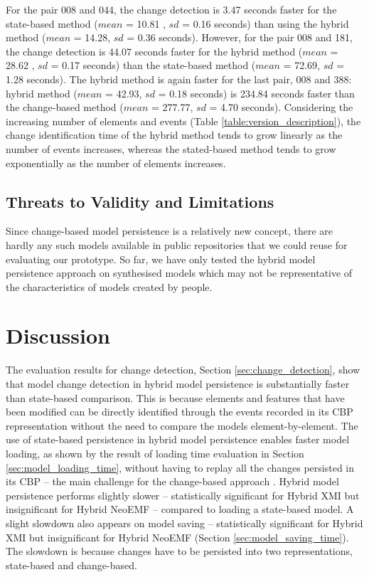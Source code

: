 \documentclass{llncs}
\begin{document}
For the pair 008 and 044, the change detection is 3.47 seconds faster for the state-based method ($mean$ = 10.81 , $sd$ = 0.16 seconds) than using the hybrid method ($mean$ = 14.28, $sd$ = 0.36 seconds). However, for the pair 008 and 181, the change detection is 44.07 seconds faster for the hybrid method ($mean$ = 28.62 , $sd$ = 0.17 seconds) than the state-based method ($mean$ = 72.69, $sd$ = 1.28 seconds). The hybrid method is again faster for the last pair, 008 and 388: hybrid method ($mean$ = 42.93, $sd$ = 0.18 seconds) is 234.84 seconds faster than the change-based method ($mean$ = 277.77, $sd$ = 4.70 seconds). Considering the increasing number of elements and events (Table \ref{table:version_description}), the change identification time of the hybrid method tends to grow linearly as the number of events increases, whereas the stated-based method tends to grow exponentially as the number of elements increases.

\subsection{Threats to Validity and Limitations}
\label{sec:threats_to_validity_and_limitations}
Since change-based model persistence is a relatively new concept, there are hardly any such models available in public repositories that we could reuse for evaluating our prototype. So far, we have only tested the hybrid model persistence approach on synthesised models which may not be representative of the characteristics of models created by people.

\section{Discussion}
\label{sec:discussion}
The evaluation results for change detection, Section \ref{sec:change_detection}, show that model change detection in hybrid model persistence is substantially faster than state-based comparison. This is because elements and features that have been modified can be directly identified through the events recorded in its CBP representation without the need to compare the models element-by-element. The use of state-based persistence in hybrid model persistence enables faster model loading, as shown by the result of loading time evaluation in Section \ref{sec:model_loading_time}, without having to replay all the changes persisted in its CBP -- the main challenge for the change-based approach \cite{yohannis2018towards,mens2002state}. 
Hybrid model persistence performs slightly slower -- statistically significant for Hybrid XMI but insignificant for Hybrid NeoEMF -- compared to loading a state-based model. A slight slowdown also appears on model saving -- statistically significant for Hybrid XMI but insignificant for Hybrid NeoEMF (Section \ref{sec:model_saving_time}). The slowdown is because changes have to be persisted into two representations, state-based and change-based. 
\end{document}
